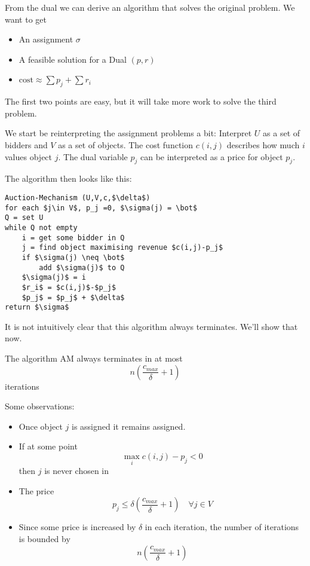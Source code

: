 From the dual we can derive an algorithm that solves the original problem. We want to get 

\begin{itemize}
\item An assignment $\sigma$
\item A feasible solution for a Dual $(p,r)$
\item $\text{cost} \approx \sum p_j + \sum r_i$
\end{itemize}

The first two points are easy, but it will take more work to solve the third problem.

We start be reinterpreting the assignment problems a bit: Interpret $U$ as a set of bidders and $V$ as a set of objects. The cost function $c(i,j)$ describes how much $i$ values object $j$. The dual variable $p_j$ can be interpreted as a price for object $p_j$.

The algorithm then looks like this:

\begin{lstlisting}
Auction-Mechanism (U,V,c,$\delta$)
for each $j\in V$, p_j =0, $\sigma(j) = \bot$
Q = set U
while Q not empty
	i = get some bidder in Q
	j = find object maximising revenue $c(i,j)-p_j$
	if $\sigma(j) \neq \bot$
		add $\sigma(j)$ to Q
	$\sigma(j)$ = i
	$r_i$ = $c(i,j)$-$p_j$
	$p_j$ = $p_j$ + $\delta$
return $\sigma$
\end{lstlisting}



It is not intuitively clear that this algorithm always terminates. We'll show that now.

\begin{lem} The algorithm AM always terminates in at most 
\[n\left(\frac {c_{max}}{\delta} +1\right)\]
iterations
\end{lem}

Some observations:

\begin{itemize}
\item Once object $j$ is assigned it remains assigned. 
\item If at some point 
\[\max_i c(i,j) - p_j <0\]
then $j$ is never chosen in %
\item The price 
\[p_j\leq \delta \left( \frac{c_{max}}{\delta} +1\right) \quad \forall j\in V\] %
\item Since some price is increased by $\delta$ in each iteration, the number of iterations is bounded by
\[n\left(\frac {c_{max}}{\delta} +1\right)\]
\end{itemize}

